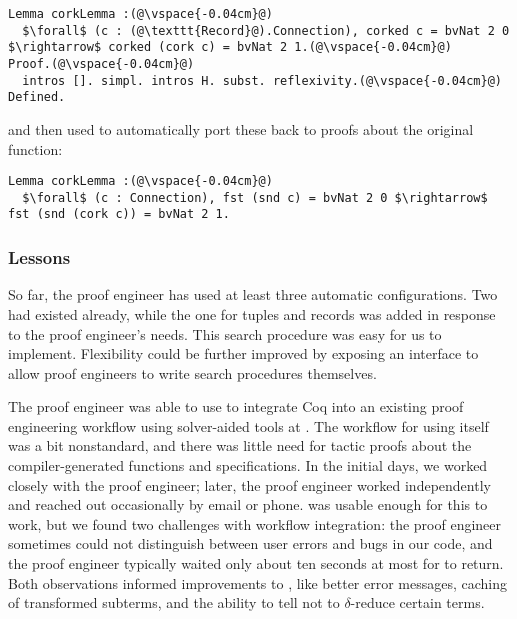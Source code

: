 \begin{lstlisting}
Lemma corkLemma :(@\vspace{-0.04cm}@)
  $\forall$ (c : (@\texttt{Record}@).Connection), corked c = bvNat 2 0 $\rightarrow$ corked (cork c) = bvNat 2 1.(@\vspace{-0.04cm}@)
Proof.(@\vspace{-0.04cm}@)
  intros []. simpl. intros H. subst. reflexivity.(@\vspace{-0.04cm}@)
Defined.
\end{lstlisting} %
and then used \toolname to automatically port these back to proofs about the original function:

\begin{lstlisting}[backgroundcolor=\color{cyan!30}]
Lemma corkLemma :(@\vspace{-0.04cm}@)
  $\forall$ (c : Connection), fst (snd c) = bvNat 2 0 $\rightarrow$ fst (snd (cork c)) = bvNat 2 1.
\end{lstlisting} %

\subsubsection{Lessons}

So far, the proof engineer has used at least three automatic configurations.
Two had existed already, while the one for tuples and records was
added in response to the proof engineer's needs.
This search procedure was easy for us to implement. %
Flexibility could be further improved by exposing an interface to allow proof engineers to
write search procedures themselves.

The proof engineer was able to use \toolname to integrate Coq into an existing proof engineering
workflow using solver-aided tools at \company.
The workflow for using \toolname itself was a bit nonstandard,
and there was little need for tactic proofs about the compiler-generated functions and specifications.
In the initial days, we worked closely with the proof engineer;
later, the proof engineer worked independently and reached out occasionally by email or phone.
\toolname was usable enough for this to work, but we found two challenges with workflow integration:
the proof engineer sometimes could not distinguish between user errors and bugs in our code,
and the proof engineer typically waited only about ten seconds at most for \toolname to return.
Both observations informed improvements to \toolname, like better error messages, caching of transformed subterms,
and the ability to tell \toolname not to $\delta$-reduce certain terms.
\fi

